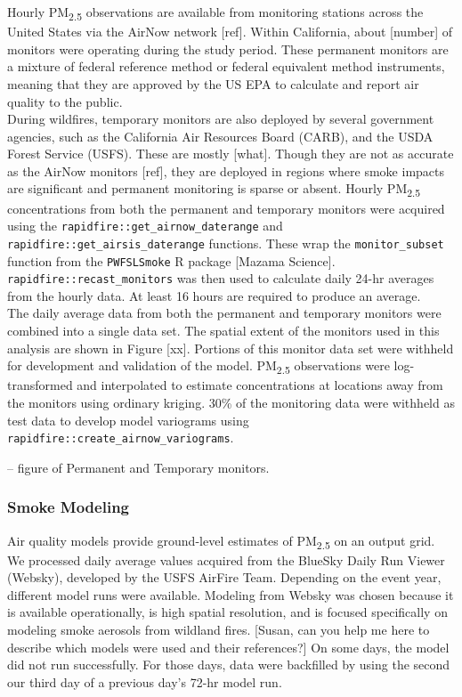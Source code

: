 \documentclass[gmd, manuscript]{copernicus}
\begin{document}
Hourly PM\textsubscript{2.5} observations are available from monitoring
stations across the United States via the AirNow network {[}ref{]}.
Within California, about {[}number{]} of monitors were operating during
the study period. These permanent monitors are a mixture of federal
reference method or federal equivalent method instruments, meaning that
they are approved by the US EPA to calculate and report air quality to
the public.\\
During wildfires, temporary monitors are also deployed by several
government agencies, such as the California Air Resources Board (CARB),
and the USDA Forest Service (USFS). These are mostly {[}what{]}. Though
they are not as accurate as the AirNow monitors {[}ref{]}, they are
deployed in regions where smoke impacts are significant and permanent
monitoring is sparse or absent. Hourly PM\textsubscript{2.5}
concentrations from both the permanent and temporary monitors were
acquired using the \texttt{rapidfire::get\_airnow\_daterange} and
\texttt{rapidfire::get\_airsis\_daterange} functions. These wrap the
\texttt{monitor\_subset} function from the \texttt{PWFSLSmoke} R package
{[}Mazama Science{]}. \texttt{rapidfire::recast\_monitors} was then used
to calculate daily 24-hr averages from the hourly data. At least 16
hours are required to produce an average.\\
The daily average data from both the permanent and temporary monitors
were combined into a single data set. The spatial extent of the monitors
used in this analysis are shown in Figure {[}xx{]}. Portions of this
monitor data set were withheld for development and validation of the
model. PM\textsubscript{2.5} observations were log-transformed and
interpolated to estimate concentrations at locations away from the
monitors using ordinary kriging. 30\% of the monitoring data were
withheld as test data to develop model variograms using
\texttt{rapidfire::create\_airnow\_variograms}.

-- figure of Permanent and Temporary monitors.

\subsubsection{Smoke Modeling}

Air quality models provide ground-level estimates of
PM\textsubscript{2.5} on an output grid. We processed daily average
values acquired from the BlueSky Daily Run Viewer (Websky), developed by
the USFS AirFire Team. Depending on the event year, different model runs
were available. Modeling from Websky was chosen because it is available
operationally, is high spatial resolution, and is focused specifically
on modeling smoke aerosols from wildland fires. {[}Susan, can you help
me here to describe which models were used and their references?{]} On
some days, the model did not run successfully. For those days, data were
backfilled by using the second our third day of a previous day's 72-hr
model run.
\end{document}
